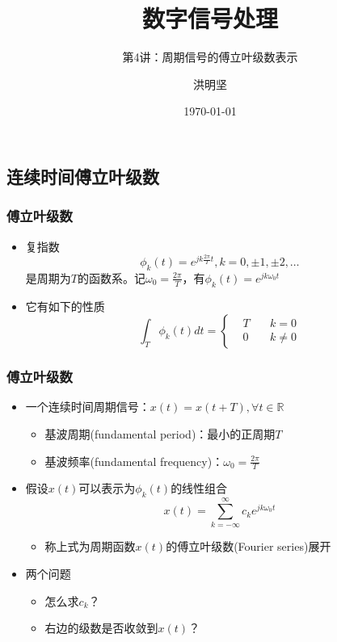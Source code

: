 \documentclass[CJKutf8,xcolor=pdftex,dvipsnames,table]{beamer}
\begin{document}
\begin{CJK*}{UTF8}{song}

  \title{ 数字信号处理}
  \subtitle{ 第4讲：周期信号的傅立叶级数表示}
  \author{ 洪明坚}
  \date{\today}


  \frame{\titlepage}
  
  \section{连续时间傅立叶级数}
  
  \begin{frame}
    \frametitle{傅立叶级数}
    \begin{itemize}
    \item 复指数\[ \phi_k(t)=e^{jk\frac{2\pi}{T} t}, k=0, \pm1 , \pm2, \hdots \]是周期为$T$的函数系。记$\omega_0=\frac{2\pi}{T}$，有$\phi_k(t)=e^{jk\omega_0 t}$
	\item 它有如下的性质 
	\[
\int_T \phi_k(t)dt = 
\left\{
    \begin {aligned}
         & T \quad & k = 0 \\
         & 0 \quad & k \neq 0                 
    \end{aligned}
\right.
	\]

    \end{itemize}      
  \end{frame}  

  \begin{frame}
    \frametitle{傅立叶级数}
    \begin{itemize}
    \item 一个连续时间周期信号：$x(t)=x(t+T), \forall t \in \mathbb{R}$
        \begin{itemize}
        \item 基波周期(fundamental period)：最小的正周期$T$
        \item 基波频率(fundamental frequency)：$\omega_0=\frac{2\pi}{T}$  
        \end{itemize}  
    \item 假设$x(t)$可以表示为$\phi_k(t)$的线性组合
    \[ 
    x(t)=\sum_{k=-\infty}^{\infty}c_k e^{jk\omega_0 t} 
    \]
	    \begin{itemize}
    	\item 称上式为周期函数$x(t)$的傅立叶级数(Fourier series)展开    
	    \end{itemize}
    \item 两个问题
    	\begin{itemize}
		\item 怎么求$c_k$？
		\item 右边的级数是否收敛到$x(t)$？
		\end{itemize}
    \end{itemize}      
  \end{frame}  
  

\end{CJK*}
\end{document}
